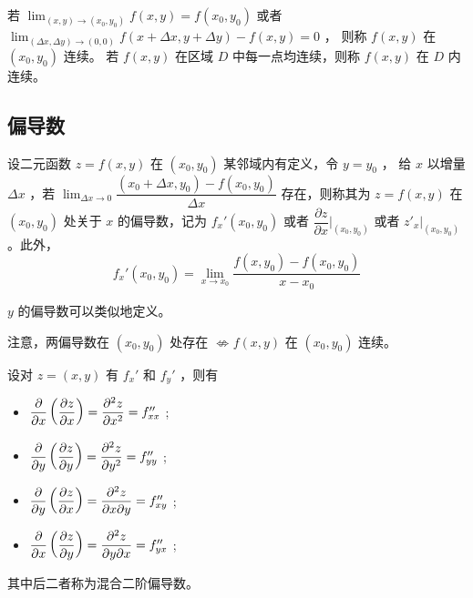 \begin{Def}[二元函数连续]

    若 $ {\displaystyle\lim_{(x,y)\rightarrow (x_0,y_0)}}f(x,y) = f(x_0,y_0) $ 
    或者$ {\displaystyle\lim_{(\Delta x,\Delta y)\rightarrow (0,0)}}
    f(x+\Delta x,y + \Delta y) - f(x,y) = 0 $ ，
    则称 $ f(x,y) $ 在 $ (x_0,y_0) $ 连续。
    若 $ f(x,y) $ 在区域 $ D $ 中每一点均连续，则称 $ f(x,y) $ 在 $ D $ 内连续。
\end{Def}

\subsection{偏导数}

\begin{Def}[偏导数]

    设二元函数 $ z = f(x,y) $ 在 $ (x_0,y_0) $ 某邻域内有定义，令 $ y = y_0 $ ，
    给 $ x $ 以增量 $ \Delta x $ ，\nextline 若 $ {\displaystyle\lim_{\Delta x\rightarrow 0}}
    \dfrac{(x_0+\Delta x,y_0)-f(x_0,y_0)}{\Delta x} $ 存在，则称其为 $ z = f(x,y) $ 
    在 $ (x_0,y_0) $ 处关于 $ x $ 的偏导数，\nextline 记为 $ f_x'(x_0,y_0) $ 
    或者 $ \dfrac{\partial z}{\partial x}\Big|_{(x_0,y_0)} $ 
    或者 $ z'_x\Big|_{(x_0,y_0)} $ 。此外，$$
        f_x'(x_0,y_0) = {\displaystyle\lim_{x\rightarrow x_0}}
        \dfrac{f(x,y_0)-f(x_0,y_0)}{x-x_0}
    $$ 
\end{Def}

$ y $ 的偏导数可以类似地定义。

注意，两偏导数在 $ (x_0,y_0) $ 处存在 $ \not\Leftrightarrow f(x,y) $ 在 $ (x_0,y_0) $ 连续。

\begin{Def}[高阶偏导数]

    设对 $ z = (x,y) $ 有 $ f_x' $ 和 $ f_y' $ ，则有
    \begin{itemize}
        \item $ \dfrac{\partial }{\partial x}\left(\dfrac{\partial z}{\partial x}\right) 
        = \dfrac{\partial^2 z}{\partial x^2} = f^{\prime\prime}_{xx} $ ;
        \item $ \dfrac{\partial }{\partial y}\left(\dfrac{\partial z}{\partial y}\right) 
        = \dfrac{\partial^2 z}{\partial y^2} = f^{\prime\prime}_{yy} $ ;
        \item $ \dfrac{\partial }{\partial y}\left(\dfrac{\partial z}{\partial x}\right) 
        = \dfrac{\partial^2 z}{\partial x\partial y} = f^{\prime\prime}_{xy} $ ;
        \item $ \dfrac{\partial }{\partial x}\left(\dfrac{\partial z}{\partial y}\right) 
        = \dfrac{\partial^2 z}{\partial y\partial x} = f^{\prime\prime}_{yx} $ ;
    \end{itemize}
    其中后二者称为混合二阶偏导数。
\end{Def}

